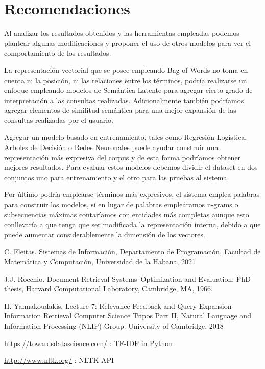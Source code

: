 \documentclass[runningheads,a4paper]{llncs}
\begin{document}
\section{Recomendaciones}

Al analizar los resultados obtenidos y las herramientas empleadas podemos plantear algunas modificaciones y proponer el uso de otros modelos para ver el comportamiento de los resultados.

La representación vectorial que se posee empleando Bag of Words no toma en cuenta ni la posición, ni las relaciones entre los términos, podría realizarse un enfoque empleando modelos de Semántica Latente para agregar cierto grado de interpretación a las consultas realizadas. Adicionalmente también podríamos agregar elementos de 
similitud semántica para una mejor expansión de las consultas realizadas por el usuario.

Agregar un modelo basado en entrenamiento, tales como Regresión Logística, Arboles de Decisión o Redes Neuronales puede ayudar construir una representación más expresiva del corpus y de esta forma podríamos obtener mejores resultados. Para evaluar estos modelos debemos dividir el dataset en dos conjuntos uno para entrenamiento y el otro para las pruebas al sistema.

Por último podría emplearse términos más expresivos, el sistema emplea palabras para construir los modelos, si en lugar de palabras empleáramos n-grams o subsecuencias máximas contaríamos con entidades más completas aunque esto conllevaría a que tenga que ser modificada la representación interna, debido a que puede aumentar considerablemente la dimensión de los vectores.

\begin{thebibliography}{4}

 C. Fleitas. Sistemas de Información, Departamento de Programación, Facultad de Matemática y Computación, Universidad de la Habana, 2021

 J.J. Rocchio. Document Retrieval Systems–Optimization and Evaluation.
PhD thesis, Harvard Computational Laboratory, Cambridge, MA, 1966.

 H. Yannakoudakis. Lecture 7: Relevance Feedback and Query
Expansion Information Retrieval Computer Science Tripos Part II, Natural Language and Information Processing (NLIP) Group. University of Cambridge, 2018 

 \url{https://towardsdatascience.com/} : TF-IDF in Python

 \url{http://www.nltk.org/} : NLTK API

\end{thebibliography}
\end{document}
